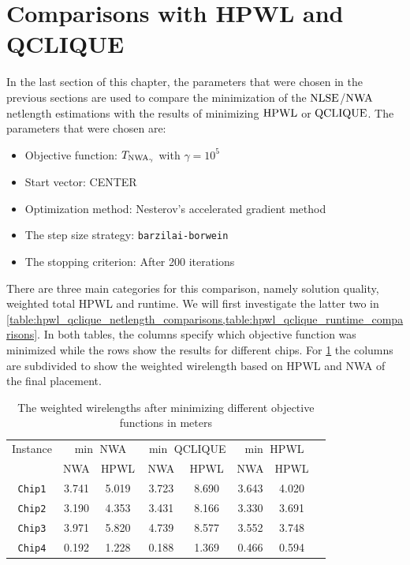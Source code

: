 \section{Comparisons with HPWL and QCLIQUE} \label{sec:comparisons_with_hpwl_and_qclique}

In the last section of this chapter, the parameters that were chosen in the previous sections are used
to compare the minimization of the \(\operatorname{NLSE}\)/\(\operatorname{NWA}\) netlength estimations
with the results of minimizing \(\operatorname{HPWL}\) or \(\operatorname{QCLIQUE}\).
The parameters that were chosen are:
\begin{itemize}
 \item Objective function: \(T_{\operatorname{NWA}_\gamma}\) with \(\gamma = 10^5\)
 \item Start vector: CENTER
 \item Optimization method: Nesterov's accelerated gradient method
 \item The step size strategy: \texttt{barzilai-borwein}
 \item The stopping criterion: After 200 iterations
\end{itemize}

There are three main categories for this comparison, namely solution quality,
weighted total HPWL and runtime.
We will first investigate the latter two in \cref{table:hpwl_qclique_netlength_comparisons,table:hpwl_qclique_runtime_comparisons}.
In both tables, the columns specify which objective function was minimized while the rows show the results for different chips.
For \cref{table:hpwl_qclique_netlength_comparisons} the columns are subdivided to show the weighted wirelength based on HPWL and NWA
of the final placement.

\begin{table}[ht] 
 \centering
 \begin{tabular}{c c c c c c c c}
  Instance       & \multicolumn{2}{c}{\(\min\) NWA} & \multicolumn{2}{c}{\(\min\) QCLIQUE} & \multicolumn{2}{c}{\(\min\) HPWL} \\
                 & NWA            & HPWL              & NWA            & HPWL                  & NWA            & HPWL               \\
  \hline
  \texttt{Chip1} & 3.741          & 5.019             & 3.723          & 8.690                 & 3.643          & 4.020              \\
  \texttt{Chip2} & 3.190          & 4.353             & 3.431          & 8.166                 & 3.330          & 3.691              \\
  \texttt{Chip3} & 3.971          & 5.820             & 4.739          & 8.577                 & 3.552          & 3.748              \\
  \texttt{Chip4} & 0.192          & 1.228             & 0.188          & 1.369                 & 0.466          & 0.594              \\
 \end{tabular}
 \caption{The weighted wirelengths after minimizing different objective functions in meters}
 \label{table:hpwl_qclique_netlength_comparisons}
\end{table}

